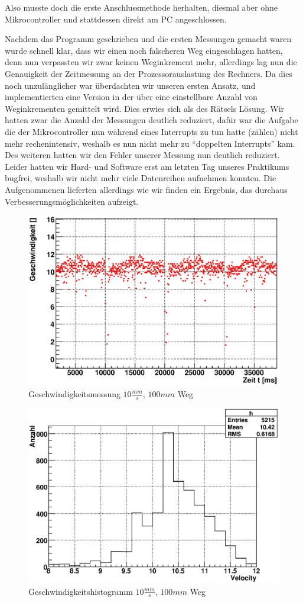 \documentclass[12pt]{article}
\begin{document}
Also musste doch die erste Anschlussmethode herhalten, diesmal aber ohne Mikrocontroller und stattdessen direkt am PC angeschlossen.

Nachdem das Programm geschrieben und die ersten Messungen gemacht waren wurde schnell klar, dass wir einen noch falscheren Weg eingeschlagen hatten, denn nun verpassten wir zwar keinen Weginkrement mehr, allerdings 
lag nun die Genauigkeit der Zeitmessung an der Prozessorauslastung des Rechners. Da dies noch unzulänglicher war überdachten wir unseren ersten Ansatz, und implementierten eine Version in der über eine einstellbare Anzahl von Weginkrementen gemittelt wird.
Dies erwies sich als des Rätsels Lösung. Wir hatten zwar die Anzahl der Messungen deutlich reduziert, dafür war die Aufgabe die der Mikrocontroller nun während eines Interrupts zu tun hatte (zählen) nicht mehr rechenintensiv, weshalb es nun nicht mehr zu ``doppelten Interrupts'' kam.
Des weiteren hatten wir den Fehler unserer Messung nun deutlich reduziert. Leider hatten wir Hard- und Software erst am letzten Tag unseres Praktikums bugfrei, weshalb wir nicht mehr viele Datenreihen aufnehmen konnten. Die Aufgenommenen lieferten allerdings wie wir finden ein 
Ergebnis, das durchaus Verbesserungsmöglichkeiten aufzeigt.
\begin{figure}[H]
 \includegraphics[width=0.9\linewidth]{pictures/speed.eps}
 \caption{Geschwindigkeitsmessung $10\frac{mm}{s}$, $100mm$ Weg}
\end{figure}
\begin{figure}[H]
 \includegraphics[width=0.9\linewidth]{pictures/speed-histo.eps}
 \caption{Geschwindigkeitshistogramm $10\frac{mm}{s}$, $100mm$ Weg}
\end{figure}
\end{document}
